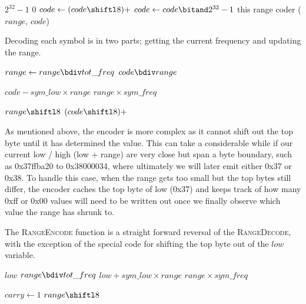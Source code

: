 \documentclass[a4paper]{article}
\begin{document}
\begin{algorithmic}[1]
  \settowidth{\maxwidth}{range\ }
  \State {} $2^{32}-1$
  \State {} $0$
    \State $code \gets (code \shiftl 8) + $
  \EndFor
  \State $code \gets code \bitand 2^{32}-1$
  \State \Return this range coder ($range$, $code$)
\EndFunction
\end{algorithmic}

Decoding each symbol is in two parts; getting the current frequency and updating the range.

\begin{algorithmic}[1]
  \State $range \gets range \bdiv tot\_freq$
  \State \Return $code \bdiv range$
\EndFunction
\end{algorithmic}

\begin{algorithmic}[1]
  \settowidth{\maxwidth}{range\ }
  \State {} $code - sym\_low \times range$
  \State {} $range \times sym\_freq$

   
    \settowidth{\maxwidth}{range\ }
    \State {} $range \shiftl 8$
    \State {} $(code\shiftl8) + $
  \EndWhile
\EndProcedure
\end{algorithmic}

As mentioned above, the encoder is more complex as it cannot shift out the top byte until it has determined the value.
This can take a considerable while if our current low / high (low + range) are very close but span a byte boundary, such as 0x37ffba20 to 0x38000034, where ultimately we will later emit either 0x37 or 0x38.
To handle this case, when the range gets too small but the top bytes still differ, the encoder caches the top byte of low (0x37) and keeps track of how many 0xff or 0x00 values will need to be written out once we finally observe which value the range has shrunk to.

The \textsc{RangeEncode} function is a straight forward reversal of the \textsc{RangeDecode}, with the exception of the special code for shifting the top byte out of the $low$ variable.

\begin{algorithmic}[1]
  \settowidth{\maxwidth}{old\_low\ }
  \State {} $low$
  \State {} $range \bdiv tot\_freq$
  \State {} $low + sym\_low \times range$
  \State {} $range \times sym\_freq$

  \Statex
    \State $carry \gets 1$ 
  \EndIf
   
    \settowidth{\maxwidth}{range\ }
    \State {} $range \shiftl 8$
    \State {}
  \EndWhile
\EndProcedure
\end{algorithmic}
\end{document}
